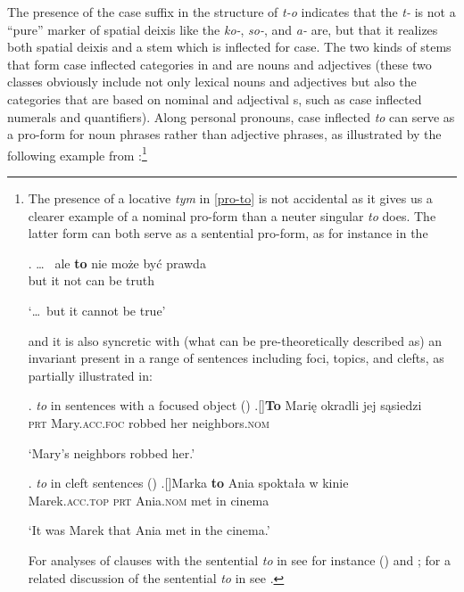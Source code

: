 The presence of the case suffix in the structure of \textit{t-o} indicates that the \textit{t-} is not a ``pure'' marker of spatial deixis like the  \textit{ko-}, \textit{so-}, and \textit{a-} are, but that it realizes both spatial deixis and a stem which is inflected for case. The two kinds of stems that form case inflected categories in  and  are nouns and adjectives (these two classes obviously include not only lexical nouns and adjectives but also the categories that are based on nominal and adjectival s, such as case inflected numerals and quantifiers). Along personal pronouns, case inflected \textit{to} can serve as a pro-form for noun phrases rather than adjective phrases, as illustrated by the following example from :\footnote{The presence of a locative \textit{tym} in \ref{pro-to} is not accidental as it gives us a clearer example of a nominal pro-form than a neuter singular \textit{to} does. The latter form can both serve as a sentential pro-form, as for instance in the  

\exg. {\ldots} \ ale \textbf{to} nie mo\.ze by\'c prawda\\
{} but it not can be truth\\
\strut  `\ldots \ but it cannot be true'

 and it is also syncretic with (what can be pre-theoretically described as) an invariant  present in a range of sentences including foci, topics, and clefts, as partially illustrated in:

\ex.  \textit{to} in sentences with a focused object (\citealt[147]{Wiland2016})
\ag.[]\hspace{-22pt}\textbf{To} Mari\k{e} okradli jej s\k{a}siedzi\\
\hspace{-22pt}\textsc{prt} Mary.\textsc{acc.foc}  robbed her neighbors.\textsc{nom}\\
\hspace{-22pt}\strut `Mary's neighbors robbed her.'

\ex.  \textit{to} in cleft sentences (\citealt[354]{Tajsner2008})
\ag.[]\hspace{-22pt}Marka \textbf{to} Ania spokta\l a w kinie\\
\hspace{-22pt}Marek.\textsc{acc.top} \textsc{prt} Ania.\textsc{nom} met in cinema\\
\hspace{-22pt}\strut `It was Marek that Ania met in the cinema.'  

For analyses of clauses with the sentential \textit{to} in  see for instance \citeauthor{Tajsner2008} (\citeyear{Tajsner2008,Tajsner2015,Tajsner2018}) and \cite{Mokrosz2014}; for a related discussion of the sentential \textit{to} in  see \cite{Simik2009}.      
} %

